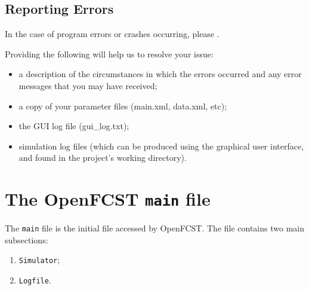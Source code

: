 \subsection{Reporting Errors}
In the case of program errors or crashes occurring,  please . 

Providing the following  will help us to resolve your issue:

\begin{itemize}
 \item a description of the circumstances in which the errors occurred and any error messages that you may have received;
 \item a copy of your parameter files (main.xml, data.xml, etc);
 \item the GUI log file (gui\_log.txt);
 \item simulation log files (which can be produced using the graphical user interface, and found in the project's working directory).
\end{itemize}

\section{The OpenFCST \texttt{main} file}

The \texttt{main} file is the initial file accessed by OpenFCST. The file contains two main subsections:
\begin{enumerate}
 \item \texttt{Simulator};
 \item \texttt{Logfile}.
\end{enumerate}

